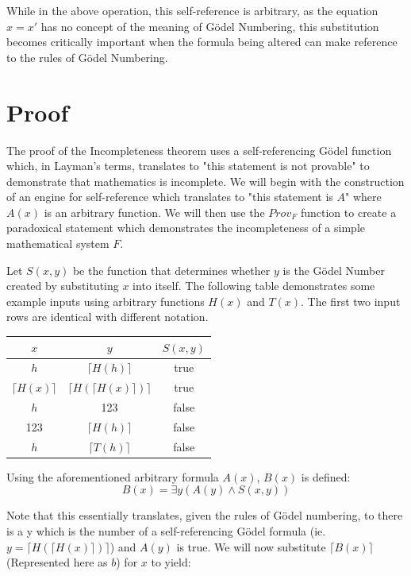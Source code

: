 \documentclass[conference]{IEEEtran}
\begin{document}
While in the above operation, this self-reference is arbitrary, as the equation $x=x'$ has no concept of the meaning of Gödel Numbering, this substitution becomes critically important when the formula being altered can make reference to the rules of Gödel Numbering. 

\section{Proof}
The proof of the Incompleteness theorem uses a self-referencing Gödel function which, in Layman's terms, translates to "this statement is not provable" to demonstrate that mathematics is incomplete. We will begin with the construction of an engine for self-reference which translates to "this statement is $A$" where $A(x)$ is an arbitrary function. We will then use the $Prov_F$ function to create a paradoxical statement which demonstrates the incompleteness of a simple mathematical system $F$.

Let $S(x, y)$ be the function that determines whether $y$ is the Gödel Number created by substituting $x$ into itself. The following table demonstrates some example inputs using arbitrary functions $H(x)$ and $T(x)$. The first two input rows are identical with different notation.
\begin{center}
\begin{tabular}{ |c|c||c| } 
 \hline
 $x$ & $y$ & $S(x,y)$\\ 
 \hline
 \hline
 $h$ & $\lceil H(h) \rceil$ & true \\ 
 \hline
 $\lceil H(x)\rceil$ & $\lceil H(\lceil H(x) \rceil)\rceil$ & true\\ 
 \hline 
 $h$ & 123 & false \\ 
 \hline
 123 & $\lceil H(h) \rceil$ & false \\ 
 \hline
 $h$ & $\lceil T(h)\rceil$ & false \\ 
 \hline
 
\end{tabular}
\end{center}

Using the aforementioned arbitrary formula $A(x)$, $B(x)$ is defined:
\[B(x) = \exists y(A(y) \land S(x,y))\]

Note that this essentially translates, given the rules of Gödel numbering, to there is a y which is the number of a self-referencing Gödel formula (ie. $y = \lceil H(\lceil H(x) \rceil) \rceil$) and $A(y)$ is true. We will now substitute $\lceil B(x) \rceil$ (Represented here as $b$) for $x$ to yield:
\end{document}
